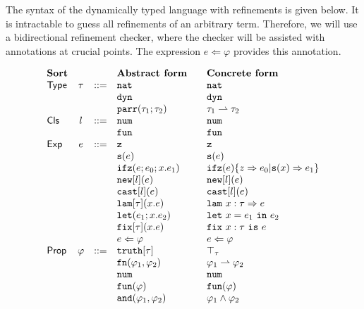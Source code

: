 \documentclass[11pt]{article}
\newcommand{\ms}[1]{\ensuremath{\mathsf{#1}}}
\newcommand{\kw}[1]{\mathtt{#1}}
\newcommand{\letbind}[3]{\kw{let}~#1=#2~\kw{in}~#3}
\newcommand{\letexp}[3]{\kw{let}(#2; \abst{#1}{#3})}
\newcommand{\lam}{\kw{lam}}
\newcommand{\fix}{\kw{fix}}
\newcommand{\parr}[2]{#1 \rightharpoonup #2}
\newcommand{\zero}{\kw{z}}
\newcommand{\suc}{\kw{s}}
\newcommand{\natt}{\kw{nat}}
\newcommand{\dynt}{\kw{dyn}}
\newcommand{\numc}{\kw{num}}
\newcommand{\func}{\kw{fun}}
\newcommand{\caste}[2]{\kw{cast}[#1](#2)}
\newcommand{\newce}[2]{\kw{new} [#1](#2)}
\newcommand{\truth}[1]{\kw{truth}[#1]}
\newcommand{\tru}[1]{\top_{#1}}
\newcommand{\prop}{\varphi}
\newcommand{\funp}[2]{\kw{fn}(#1,#2)}
\newcommand{\isfun}[1]{\kw{fun}(#1)}
\newcommand{\isnum}{\kw{num}}
\newcommand{\ana}{\Leftarrow}
\newcommand{\refana}[2]{#1 \ana #2}
\newcommand{\abst}[2]{#1.#2}
\newcommand{\goesto}{\Rightarrow}
\newcommand{\ifz}{\kw{ifz}}
\begin{document}
The syntax of the dynamically typed language with refinements is given below.
It is intractable to guess all refinements of an arbitrary term. Therefore, we will use a bidirectional refinement checker, where the checker will be assisted with annotations at crucial points. The expression $\refana{e}{\prop}$ provides this annotation.

\[
\begin{array}{l c c l@{\qquad} l}
\text{\bf Sort} & & & \text{\bf Abstract form} & \text{\bf Concrete form} \\
\ms{Type} & \tau & ::= &\natt                     & \natt    \\
          &      &     &\dynt                     & \dynt    \\
          &      &     &\kw{parr}(\tau_1;\tau_2) & \parr{\tau_1}{\tau_2}\\
\ms{Cls}  & l    & ::= &\numc                     & \numc\\
          &      &     &\func                     & \func\\
\ms{Exp}  & e    & ::= &\zero                     & \zero\\
          &      &    & \suc(e)                   & \suc(e)\\
          &      &    & \ifz(e;e_0;x.e_1)         & \ifz(e) \{z \goesto e_0 | \suc(x) \goesto e_1\}\\
          &      &    & \newce{l}{e}              & \newce{l}{e}\\
          &      &    & \caste{l}{e}              & \caste{l}{e}\\
          &      &    & \lam[\tau](x.e)           & \lam ~x : \tau \goesto e\\
          &      &    & \letexp{x}{e_1}{e_2}      & \letbind{x}{e_1}{e_2} \\
          &      &    & \fix[\tau](x.e)           & \fix ~x : \tau ~\kw{is}~ e\\
          &      &    & \refana{e}{\prop}         & \refana{e}{\prop}\\
\ms{Prop} & \prop& ::=& \truth{\tau}              & \tru{\tau} \\
          &      &    & \funp{\prop_1}{\prop_2}   & \parr{\prop_1}{\prop_2}\\
          &      &    & \isnum                    & \isnum     \\
          &      &    & \isfun{\prop}             & \isfun{\prop}    \\
          &      &    & \kw{and}(\prop_1,\prop_2)& \prop_1 \land \prop_2\\
\end{array}
\]
\end{document}
